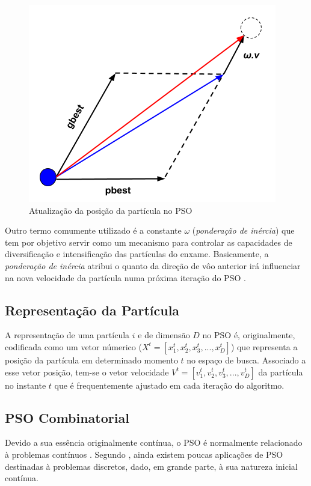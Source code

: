 \documentclass[
	12pt,				%
	openany,			%
	oneside,	
	a4paper,			%
	brazil,				%
	]{unimontes-ppgmsc-abntex2}
\begin{document}
\begin{figure}[ht]
\label{fig:nova_part}
\centering
\includegraphics[scale=.5]{img/nova_part}
\caption{Atualização da posição da partícula no PSO}
\end{figure}

Outro termo comumente utilizado é a constante $\omega$ ({\em ponderação de inércia}) que tem por objetivo servir como um mecanismo para controlar as capacidades de diversificação e intensificação das partículas do enxame. Basicamente, a {\em ponderação de inércia} atribui o quanto da direção de vôo anterior irá influenciar na nova velocidade da partícula numa próxima iteração do PSO \cite{Rini_2011}.

\subsection{Representação da Partícula}
\label{sec:repr_part}

A representação de uma partícula $i$ e de dimensão $D$ no PSO é, originalmente, codificada como um vetor númerico ($X^t =[x^t_1, x^t_2, x^t_3, ... ,x^t_D]$) que representa a posição da partícula  em determinado momento $t$ no espaço de busca. Associado a esse vetor posição, tem-se o vetor velocidade $V^t =[v^t_1, v^t_2, v^t_3, ... , v^t_D]$ da partícula no instante $t$ que é frequentemente ajustado em cada iteração do algoritmo.

\subsection{PSO Combinatorial}
\label{sec:pso_discretos}

Devido a sua essência originalmente contínua, o PSO é normalmente relacionado à problemas contínuos \cite{Kennedy_1997}. Segundo , ainda existem poucas aplicações de PSO destinadas à problemas discretos, dado, em grande parte, à sua natureza inicial contínua. 
\end{document}
